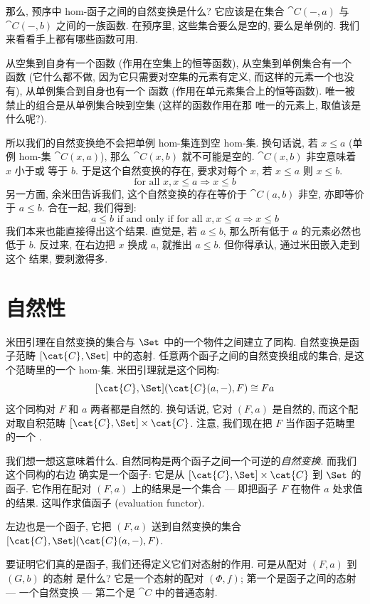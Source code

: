 那么, 预序中 hom-函子之间的自然变换是什么? 它应该是在集合 $\cat{C}(-, a)$ 与 $\cat{C}(-, b)$
之间的一族函数. 在预序里, 这些集合要么是空的, 要么是单例的. 我们来看看手上都有哪些函数可用.

从空集到自身有一个函数 (作用在空集上的恒等函数), 从空集到单例集合有一个  函数
(它什么都不做, 因为它只需要对空集的元素有定义, 而这样的元素一个也没有), 从单例集合到自身也有一个
函数 (作用在单元素集合上的恒等函数). 唯一被禁止的组合是从单例集合映到空集 (这样的函数作用在那
唯一的元素上, 取值该是什么呢?).

所以我们的自然变换绝不会把单例 hom-集连到空 hom-集. 换句话说, 若 $x \leqslant a$ (单例 hom-集
$\cat{C}(x, a)$), 那么 $\cat{C}(x, b)$ 就不可能是空的. $\cat{C}(x, b)$ 非空意味着 $x$ 小于或
等于 $b$. 于是这个自然变换的存在, 要求对每个 $x$, 若 $x \leqslant a$ 则 $x \leqslant b$.
\[\text{for all } x, x \leqslant a \Rightarrow x \leqslant b\]
另一方面, 余米田告诉我们, 这个自然变换的存在等价于 $\cat{C}(a, b)$ 非空, 亦即等价于
$a \leqslant b$. 合在一起, 我们得到:
\[a \leqslant b \text{ if and only if for all } x, x \leqslant a \Rightarrow x \leqslant b\]
我们本来也能直接得出这个结果. 直觉是, 若 $a \leqslant b$, 那么所有低于 $a$ 的元素必然也低于
$b$. 反过来, 在右边把 $x$ 换成 $a$, 就推出 $a \leqslant b$. 但你得承认, 通过米田嵌入走到这个
结果, 要刺激得多.

\section{自然性}

米田引理在自然变换的集合与 $\Set$ 中的一个物件之间建立了同构. 自然变换是函子范畴
$[\cat{C}, \Set]$ 中的态射. 任意两个函子之间的自然变换组成的集合, 是这个范畴里的一个 hom-集.
米田引理就是这个同构:
\[[\cat{C}, \Set](\cat{C}(a, -), F) \cong F a\]
这个同构对 $F$ 和 $a$ 两者都是自然的. 换句话说, 它对 $(F, a)$ 是自然的, 而这个配对取自积范畴
$[\cat{C}, \Set] \times \cat{C}$. 注意, 我们现在把 $F$ 当作函子范畴里的一个 .

我们想一想这意味着什么. 自然同构是两个函子之间一个可逆的\emph{自然变换}. 而我们这个同构的右边
确实是一个函子: 它是从 $[\cat{C}, \Set] \times \cat{C}$ 到 $\Set$ 的函子. 它作用在配对
$(F, a)$ 上的结果是一个集合 --- 即把函子 $F$ 在物件 $a$ 处求值的结果. 这叫作求值函子 (evaluation
functor).

左边也是一个函子, 它把 $(F, a)$ 送到自然变换的集合
$[\cat{C}, \Set](\cat{C}(a, -), F)$.

要证明它们真的是函子, 我们还得定义它们对态射的作用. 可是从配对 $(F, a)$ 到 $(G, b)$ 的态射
是什么? 它是一个态射的配对 $(\Phi, f)$; 第一个是函子之间的态射 --- 一个自然变换 --- 第二个是
$\cat{C}$ 中的普通态射.

